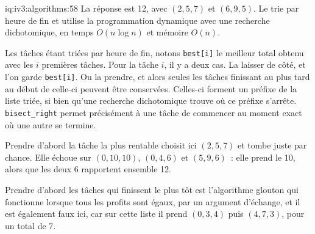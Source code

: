 \begin{solution}{iq:iv3:algorithms:58}
La réponse est 12, avec $(2, 5, 7)$ et $(6, 9, 5)$. Le  trie par heure de fin et utilise la programmation dynamique avec une recherche dichotomique, en temps $O(n \log n)$ et mémoire $O(n)$.
\label{lst:iv3:al:weighted}

Les tâches étant triées par heure de fin, notons \texttt{best[i]} le meilleur total obtenu avec les $i$ premières tâches. Pour la tâche $i$, il y a deux cas. La laisser de côté, et l'on garde \texttt{best[i]}. Ou la prendre, et alors seules les tâches finissant au plus tard au début de celle-ci peuvent être conservées. Celles-ci forment un préfixe de la liste triée, si bien qu'une recherche dichotomique trouve où ce préfixe s'arrête. \texttt{bisect\_right} permet précisément à une tâche de commencer au moment exact où une autre se termine.

Prendre d'abord la tâche la plus rentable choisit ici $(2, 5, 7)$ et tombe juste par chance. Elle échoue sur $(0, 10, 10)$, $(0, 4, 6)$ et $(5, 9, 6)$~: elle prend le 10, alors que les deux 6 rapportent ensemble 12.

Prendre d'abord les tâches qui finissent le plus tôt est l'algorithme glouton qui fonctionne lorsque tous les profits sont égaux, par un argument d'échange, et il est également faux ici, car sur cette liste il prend $(0, 3, 4)$ puis $(4, 7, 3)$, pour un total de 7.

\end{solution}

